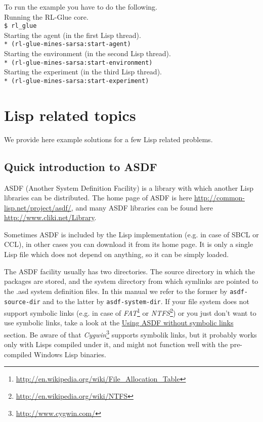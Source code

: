 \documentclass[11pt,a4paper,dvipdfm]{article}
\newcommand{\selfref}[1]{\href{#1}{#1}}
\newcommand{\footref}[2]{\textsl{#1}\footnote{\selfref{#2}}}
\newcommand{\prompttext}[1]{\texttt{#1}}
\newcommand{\shprompt}[1]{\prompttext{\$ #1}}
\newcommand{\lispprompt}[1]{\prompttext{* #1}}
\begin{document}
To run the example you have to do the following. \\
Running the RL-Glue core. \\
\shprompt{rl\_glue} \\
Starting the agent (in the first Lisp thread). \\
\lispprompt{(rl-glue-mines-sarsa:start-agent)} \\
Starting the environment (in the second Lisp thread). \\
\lispprompt{(rl-glue-mines-sarsa:start-environment)} \\
Starting the experiment (in the third Lisp thread). \\
\lispprompt{(rl-glue-mines-sarsa:start-experiment)}

\section{Lisp related topics}

We provide here example solutions for a few Lisp related problems.

\subsection{Quick introduction to ASDF}
\hypertarget{asdfintro}{}

ASDF (Another System Definition Facility) is a library with which another
Lisp libraries can be distributed. The home page of ASDF is here
\selfref{http://common-lisp.net/project/asdf/}, and many ASDF libraries can
be found here \selfref{http://www.cliki.net/Library}.

Sometimes ASDF is included by the Lisp implementation (e.g. in case of SBCL
or CCL), in other cases you can download it from its home page. It is only a
single Lisp file which does not depend on anything, so it can be simply loaded.

The ASDF facility usually has two directories. The source directory in which
the packages are stored, and the system directory from which symlinks are
pointed to the .asd system definition files. In this manual we refer to the
former by \prompttext{asdf-source-dir} and to the latter by
\prompttext{asdf-system-dir}. If your file system does not support symbolic
links (e.g. in case of 
\footref{FAT}{http://en.wikipedia.org/wiki/File\_Allocation\_Table} or
\footref{NTFS}{http://en.wikipedia.org/wiki/NTFS}) or you just don't
want to use symbolic links, take a look at the
\hyperlink{nosymlink}{Using ASDF without symbolic links} section. Be aware
of that \footref{Cygwin}{http://www.cygwin.com/} supports symbolik links,
but it probably works only with Lisps compiled under it, and might not
function well with the pre-compiled Windows Lisp binaries.
\end{document}
